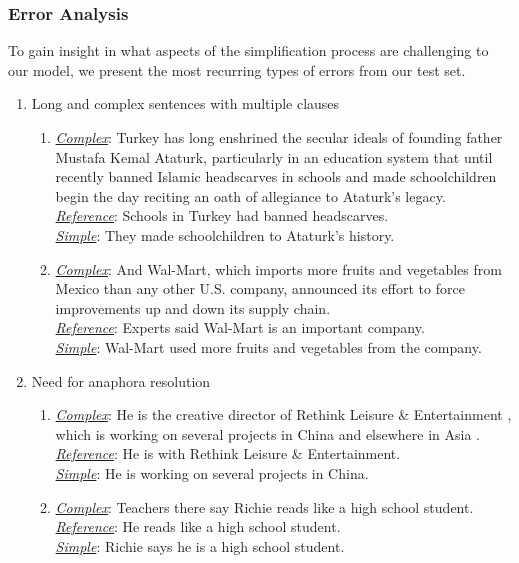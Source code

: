 \documentclass[thesis.tex]{subfiles}
\begin{document}
\subsubsection{Error Analysis} \label{sec:sentence_errors}

To gain insight in what aspects of the simplification process are challenging to our model, we present the most recurring types of errors from our test set.

\begin{enumerate}
\item{Long and complex sentences with multiple clauses}

\begin{enumerate}
\small
\item{\label{longandcomplex1}} \underline{\it Complex}: Turkey has long enshrined the secular ideals of founding father Mustafa Kemal Ataturk, particularly in an education system that until recently banned Islamic headscarves in schools and made schoolchildren begin the day reciting an oath of allegiance to Ataturk's legacy. \\
\underline{\it Reference}: Schools in Turkey had banned headscarves.\\
\underline{\it Simple}: They made schoolchildren to Ataturk's history.

\item{\label{longandcomplex2}} \underline{\it Complex}: And Wal-Mart, which imports more fruits and vegetables from Mexico than any other U.S. company, announced its effort to force improvements up and down its supply chain.\\
\underline{\it Reference}: Experts said Wal-Mart is an important company.\\
\underline{\it Simple}: Wal-Mart used more fruits and vegetables from the company.
\end{enumerate}

\item{Need for anaphora resolution}
\begin{enumerate}
\small
\item {\label{anaphoraresolution1}} \underline{\it Complex}: He is the creative director of Rethink Leisure \& Entertainment , which is working on several projects in China and elsewhere in Asia . \\
\underline{\it Reference}: He is with Rethink Leisure \& Entertainment.\\
\underline{\it Simple}: He is working on several projects in China.

\item {\label{anaphoraresolution2}} \underline{\it Complex}: Teachers there say Richie reads like a high school student.\\
\underline{\it Reference}: He reads like a high school student. \\
\underline{\it Simple}: Richie says he is a high school student.
\end{enumerate}


\end{enumerate}
\end{document}
